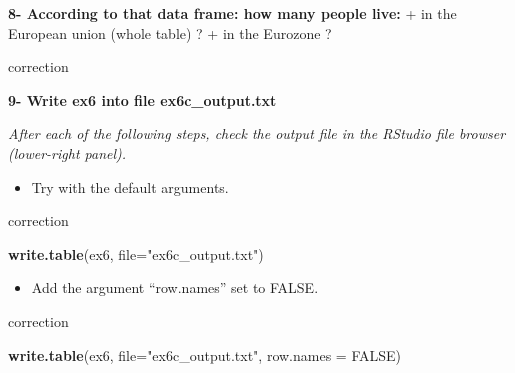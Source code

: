 \documentclass[]{book}
\newenvironment{Shaded}{\begin{snugshade}}{\end{snugshade}}
\newcommand{\CommentTok}[1]{\textcolor[rgb]{0.56,0.35,0.01}{\textit{#1}}}
\newcommand{\DataTypeTok}[1]{\textcolor[rgb]{0.13,0.29,0.53}{#1}}
\newcommand{\KeywordTok}[1]{\textcolor[rgb]{0.13,0.29,0.53}{\textbf{#1}}}
\newcommand{\NormalTok}[1]{#1}
\newcommand{\OperatorTok}[1]{\textcolor[rgb]{0.81,0.36,0.00}{\textbf{#1}}}
\newcommand{\OtherTok}[1]{\textcolor[rgb]{0.56,0.35,0.01}{#1}}
\newcommand{\StringTok}[1]{\textcolor[rgb]{0.31,0.60,0.02}{#1}}
\providecommand{\tightlist}{%
  \setlength{\itemsep}{0pt}\setlength{\parskip}{0pt}}
\begin{document}
\textbf{8- According to that data frame: how many people live:}
+ in the European union (whole table) ?
+ in the Eurozone ?

correction

\begin{Shaded}
\end{Shaded}

\textbf{9- Write ex6 into file ex6c\_output.txt}

\emph{After each of the following steps, check the output file in the RStudio file browser (lower-right panel).}

\begin{itemize}
\tightlist
\item
  Try with the default arguments.
\end{itemize}

correction

\begin{Shaded}
\begin{Highlighting}[]
\KeywordTok{write.table}\NormalTok{(ex6, }\DataTypeTok{file=}\StringTok{"ex6c_output.txt"}\NormalTok{)}
\end{Highlighting}
\end{Shaded}

\begin{itemize}
\tightlist
\item
  Add the argument ``row.names'' set to FALSE.
\end{itemize}

correction

\begin{Shaded}
\begin{Highlighting}[]
\KeywordTok{write.table}\NormalTok{(ex6, }\DataTypeTok{file=}\StringTok{"ex6c_output.txt"}\NormalTok{, }
            \DataTypeTok{row.names =} \OtherTok{FALSE}\NormalTok{)}
\end{Highlighting}
\end{Shaded}
\end{document}
